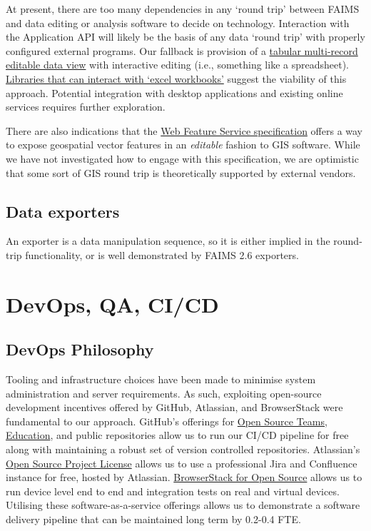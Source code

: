 \documentclass{faims3_report}
\begin{document}
At present, there are too many dependencies in any `round trip' between
FAIMS and data editing or analysis software to decide on technology.
Interaction with the Application API will likely be the basis of any
data `round trip' with properly configured external programs. Our
fallback is provision of a
\href{https://www.npmjs.com/package/editable-table}{{tabular
multi-record editable data view}} with interactive editing (i.e.,
something like a spreadsheet).
\href{https://www.npmjs.com/package/xlsx}{{Libraries that can interact
with `excel workbooks'}} suggest the viability of this approach.
Potential integration with desktop applications and existing online
services requires further exploration.

There are also indications that the
\href{https://www.ogc.org/standards/wfs}{{Web Feature Service
specification}} offers a way to expose geospatial vector features in an
\emph{editable} fashion to GIS software. While we have not investigated
how to engage with this specification, we are optimistic that some sort
of GIS round trip is theoretically supported by external vendors.

\subsection{Data exporters}

An exporter is a data manipulation sequence, so it is either implied in
the round-trip functionality, or is well demonstrated by FAIMS 2.6
exporters.

\section{DevOps, QA, CI/CD}

\subsection{DevOps Philosophy}

Tooling and infrastructure choices have been made to minimise system
administration and server requirements. As such, exploiting open-source
development incentives offered by GitHub, Atlassian, and BrowserStack
were fundamental to our approach. GitHub's offerings for
\href{https://github.com/account/organizations/new?plan=free\&ref_cta=Sign\%2520up\%2520your\%2520team\&ref_loc=changing\%2520the\%2520world\&ref_page=\%2Fpricing\&source=pricing-open-source}{{Open
Source Teams}}, \href{https://education.github.com}{{Education}}, and
public repositories allow us to run our CI/CD pipeline for free along
with maintaining a robust set of version controlled repositories.
Atlassian's
\href{https://www.atlassian.com/software/views/open-source-license-request}{{Open
Source Project License}} allows us to use a professional Jira and
Confluence instance for free, hosted by Atlassian.
\href{https://www.browserstack.com/open-source}{{BrowserStack for Open
Source}} allows us to run device level end to end and integration tests
on real and virtual devices. Utilising these software-as-a-service
offerings allows us to demonstrate a software delivery pipeline that can
be maintained long term by 0.2-0.4 FTE.
\end{document}
